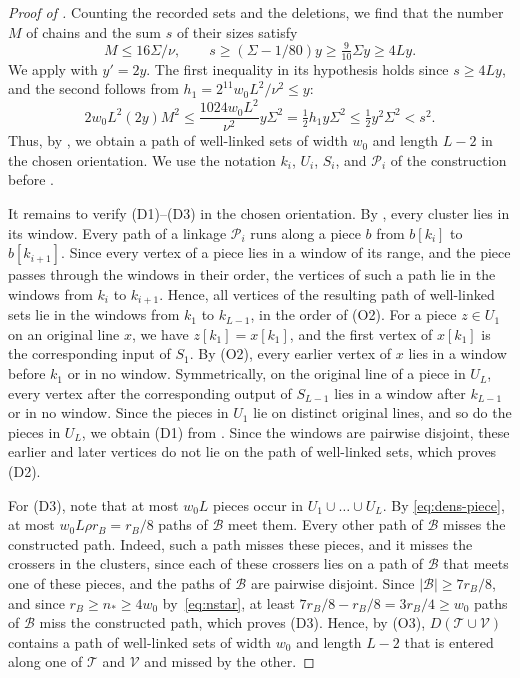\documentclass[fontsize=12pt,leading=14pt]{fullpaper}
\newcommand{\Bcal}{\mathcal{B}}
\newcommand{\Pcal}{\mathcal{P}}
\newcommand{\Tcal}{\mathcal{T}}
\newcommand{\Vcal}{\mathcal{V}}
\begin{document}
\begin{proof}[Proof of ]
  Counting the recorded sets and the deletions, we find that the number $M$ of chains and the sum $s$ of their sizes satisfy
  \[
    M\le16\Sigma/\nu,\qquad
    s\ge(\Sigma-1/80)y\ge\tfrac9{10}\Sigma y\ge4Ly.
  \]
  We apply  with $y'=2y$.
  The first inequality in its hypothesis holds since $s\ge4Ly$, and the second follows from $h_1=2^{11}w_0L^2/\nu^2\le y$:
  \[
    2w_0L^2(2y)M^2
    \le\frac{1024w_0L^2}{\nu^2}y\Sigma^2
    =\tfrac12h_1y\Sigma^2
    \le\tfrac12y^2\Sigma^2<s^2.
  \]
  Thus, by , we obtain a path of well-linked sets of width $w_0$ and length $L-2$ in the chosen orientation.
  We use the notation $k_i$, $U_i$, $S_i$, and $\Pcal_i$ of the construction before .

  It remains to verify (D1)--(D3) in the chosen orientation.
  By , every cluster lies in its window.
  Every path of a linkage $\Pcal_i$ runs along a piece $b$ from $b[k_i]$ to $b[k_{i+1}]$.
  Since every vertex of a piece lies in a window of its range, and the piece passes through the windows in their order, the vertices of such a path lie in the windows from $k_i$ to $k_{i+1}$.
  Hence, all vertices of the resulting path of well-linked sets lie in the windows from $k_1$ to $k_{L-1}$, in the order of (O2).
  For a piece $z\in U_1$ on an original line $x$, we have $z[k_1]=x[k_1]$, and the first vertex of $x[k_1]$ is the corresponding input of $S_1$.
  By (O2), every earlier vertex of $x$ lies in a window before $k_1$ or in no window.
  Symmetrically, on the original line of a piece in $U_L$, every vertex after the corresponding output of $S_{L-1}$ lies in a window after $k_{L-1}$ or in no window.
  Since the pieces in $U_1$ lie on distinct original lines, and so do the pieces in $U_L$, we obtain (D1) from .
  Since the windows are pairwise disjoint, these earlier and later vertices do not lie on the path of well-linked sets, which proves (D2).

  For (D3), note that at most $w_0L$ pieces occur in $U_1\cup\dots\cup U_L$.
  By \eqref{eq:dens-piece}, at most $w_0L\rho r_B=r_B/8$ paths of $\Bcal$ meet them.
  Every other path of $\Bcal$ misses the constructed path.
  Indeed, such a path misses these pieces, and it misses the crossers in the clusters, since each of these crossers lies on a path of $\Bcal$ that meets one of these pieces, and the paths of $\Bcal$ are pairwise disjoint.
  Since $|\Bcal|\ge7r_B/8$, and since $r_B\ge n_*\ge4w_0$ by~\eqref{eq:nstar}, at least $7r_B/8-r_B/8=3r_B/4\ge w_0$ paths of $\Bcal$ miss the constructed path, which proves (D3).
  Hence, by (O3), $D(\Tcal\cup\Vcal)$ contains a path of well-linked sets of width $w_0$ and length $L-2$ that is entered along one of $\Tcal$ and $\Vcal$ and missed by the other.
\end{proof}
\end{document}
